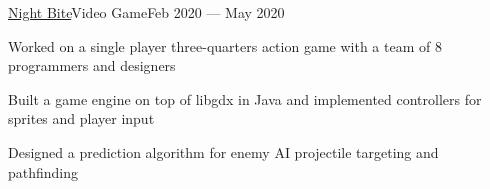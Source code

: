 \documentclass{resume}
\begin{document}
\begin{projects}
    \begin{entry}{\href{https://github.com/oliver-leung/night-bite}{Night Bite}}{Video Game}{Feb 2020 --- May 2020}
        \begin{description}
            \item Worked on a single player three-quarters action game with a
                team of 8 programmers and designers
            \item Built a game engine on top of libgdx in Java and implemented
                controllers for sprites and player input
            \item Designed a prediction algorithm for enemy AI projectile
                targeting and pathfinding
        \end{description}
    \end{entry}



\end{projects}
\end{document}
